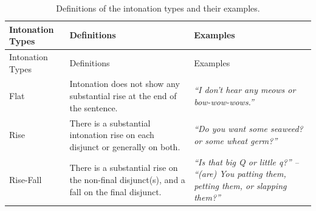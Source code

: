 \documentclass[oneside]{report}
\theoremstyle{definition}
\theoremstyle{definition}
\theoremstyle{definition}
\theoremstyle{remark}
\begin{document}
\begin{longtable}[]{@{}lll@{}}
\caption{\label{tab:intonationTypes} Definitions of the intonation types and
their examples.}\tabularnewline
\toprule
\begin{minipage}[b]{0.18\columnwidth}\raggedright\strut
Intonation Types\strut
\end{minipage} & \begin{minipage}[b]{0.30\columnwidth}\raggedright\strut
Definitions\strut
\end{minipage} & \begin{minipage}[b]{0.44\columnwidth}\raggedright\strut
Examples\strut
\end{minipage}\tabularnewline
\midrule
\endfirsthead
\toprule
\begin{minipage}[b]{0.18\columnwidth}\raggedright\strut
Intonation Types\strut
\end{minipage} & \begin{minipage}[b]{0.30\columnwidth}\raggedright\strut
Definitions\strut
\end{minipage} & \begin{minipage}[b]{0.44\columnwidth}\raggedright\strut
Examples\strut
\end{minipage}\tabularnewline
\midrule
\endhead
\begin{minipage}[t]{0.18\columnwidth}\raggedright\strut
Flat\strut
\end{minipage} & \begin{minipage}[t]{0.30\columnwidth}\raggedright\strut
Intonation does not show any substantial rise at the end of the
sentence.\strut
\end{minipage} & \begin{minipage}[t]{0.44\columnwidth}\raggedright\strut
\emph{``I don't hear any meows or bow-wow-wows.''}\strut
\end{minipage}\tabularnewline
\begin{minipage}[t]{0.18\columnwidth}\raggedright\strut
Rise\strut
\end{minipage} & \begin{minipage}[t]{0.30\columnwidth}\raggedright\strut
There is a substantial intonation rise on each disjunct or generally on
both.\strut
\end{minipage} & \begin{minipage}[t]{0.44\columnwidth}\raggedright\strut
\emph{``Do you want some seaweed? or some wheat germ?''}\strut
\end{minipage}\tabularnewline
\begin{minipage}[t]{0.18\columnwidth}\raggedright\strut
Rise-Fall\strut
\end{minipage} & \begin{minipage}[t]{0.30\columnwidth}\raggedright\strut
There is a substantial rise on the non-final disjunct(s), and a fall on
the final disjunct.\strut
\end{minipage} & \begin{minipage}[t]{0.44\columnwidth}\raggedright\strut
\emph{``Is that big Q or little q?'' -- ``(are) You patting them,
petting them, or slapping them?''}\strut
\end{minipage}\tabularnewline
\bottomrule
\end{longtable}
\end{document}
